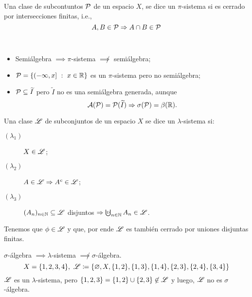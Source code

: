 \begin{definition}[$\pi$-sistema]
	Una clase de subcontuntos $\mathcal{P}$ de un espacio $X$, se dice un $\pi$-sistema si es cerrado por intersecciones finitas, i.e.,
	\[ A,B \in \mathcal{P} \Rightarrow{} A \cap B \in \mathcal{P} \]
\end{definition}
\smallskip
\begin{eg}~
	\begin{itemize}
		\item Semiálgebra $\implies \pi$-sistema $\not\implies$ semiálgebra;
		
		\item $\mathcal{P} = \{(-\infty,x] \ : \ x \in \mathbb{R}\}$ es un $\pi$-sistema pero no semiálgebra;

		\item $\mathcal{P} \subseteq \widetilde{I}$ pero $\widetilde{I}$ no es una semiálgebra generada, aunque
		\[ \mathcal{A}(\mathcal{P}) = \mathcal{P}(\widetilde{I}) \Rightarrow \sigma(\mathcal{P}) = \beta(\mathbb{R}). \]
	\end{itemize}
\end{eg}
\begin{definition}
	Una clase $\mathscr{L}$ de subconjuntos de un espacio $X$ se dice un $\lambda$-sistema si:
	\begin{description}
		\item[$(\lambda_{1})$] $X \in \mathscr{L}$;

		\item[$(\lambda_{2})$] $A \in \mathscr{L} \Rightarrow A^c \in \mathscr{L}$;

		\item[$(\lambda_{3})$] $(A_n)_{n\in\mathbb{N}} \subseteq \mathscr{L}$ disjuntos $\implies \textbigcupd_{n\in\N} A_n \in \mscr{L}$.
	\end{description}
\end{definition}

\begin{note}
	Tenemos que $\phi \in \mathscr{L}$ y que, por ende $\mathscr{L}$ es también cerrado por uniones disjuntas finitas.
\end{note}

\begin{eg}
	$\sigma$-álgebra $\implies \lambda$-sistema $\not\implies \sigma$-álgebra.
	\[ X = \{1,2,3,4\}, \ \mathscr{L} \coloneq \{\varnothing, X, \{1,2\}, \{1,3\}, \{1,4\}, \{2,3\}, \{2,4\}, \{3,4\}\} \]
	$\mathscr{L}$ es un $\lambda$-sistema, pero $\{1,2,3\} = \{1,2\} \cup \{2,3\} \not\in \mathscr{L}$ y luego, $\mathscr{L}$ no es $\sigma$-álgebra.
\end{eg}

